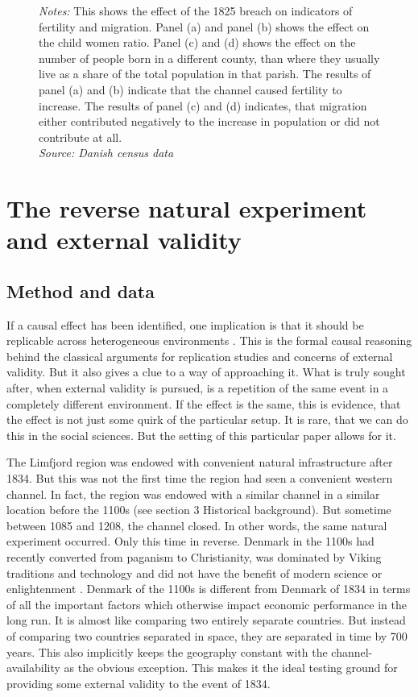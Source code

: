 \documentclass[11pt]{article}
\begin{document}
\begin{figure}[h!]
\begin{subfigure}[b]{0.45\textwidth}
    \end{subfigure}
    \parbox{0.9\textwidth}{
    \caption*{\footnotesize \textit{Notes:} This shows the effect of the 1825 breach on indicators of fertility and migration. Panel (a) and panel (b) shows the effect on the child women ratio. Panel (c) and (d) shows the effect on the number of people born in a different county, than where they usually live as a share of the total population in that parish. The results of panel (a) and (b) indicate that the channel caused fertility to increase. The results of panel (c) and (d) indicates, that migration either contributed negatively to the increase in population or did not contribute at all.  \\ \textit{Source: Danish census data}}
}
    \label{fig:migr_fert}
\end{figure}

\FloatBarrier

\section{The reverse natural experiment and external validity}

\subsection{Method and data}
If a causal effect has been identified, one implication is that it should be replicable across heterogeneous environments \citep{Peters2016}. This is the formal causal reasoning behind the classical arguments for replication studies and concerns of external validity. But it also gives a clue to a way of approaching it. What is truly sought after, when external validity is pursued, is a repetition of the same event in a completely different environment. If the effect is the same, this is evidence, that the effect is not just some quirk of the particular setup. It is rare, that we can do this in the social sciences. But the setting of this particular paper allows for it. 

The Limfjord region was endowed with convenient natural infrastructure after 1834. But this was not the first time the region had seen a convenient western channel. In fact, the region was endowed with a similar channel in a similar location before the 1100s (see section 3 Historical background). But sometime between 1085 and 1208, the channel closed. In other words, the same natural experiment occurred. Only this time in reverse. Denmark in the 1100s had recently converted from paganism to Christianity, was dominated by Viking traditions and technology and did not have the benefit of modern science or enlightenment \citep{Roesdahl2022, milkandbutter}. Denmark of the 1100s is different from Denmark of 1834 in terms of all the important factors which otherwise impact economic performance in the long run. It is almost like comparing two entirely separate countries. But instead of comparing two countries separated in space, they are separated in time by 700 years. This also implicitly keeps the geography constant with the channel-availability as the obvious exception. This makes it the ideal testing ground for providing some external validity to the event of 1834.
\end{document}
